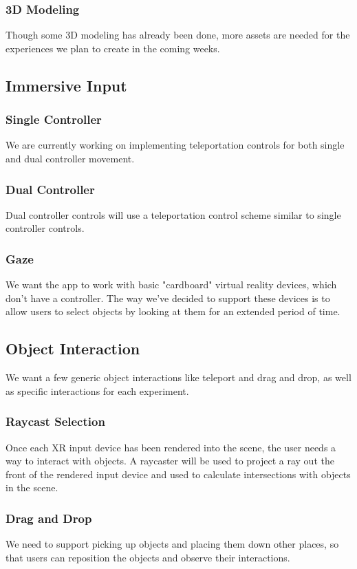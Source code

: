 \documentclass[onecolumn, draftclsnofoot,10pt, compsoc]{IEEEtran}
\begin{document}
\subsubsection{3D Modeling}
Though some 3D modeling has already been done, more assets are needed for the experiences we plan to create in the coming weeks.
\subsection{Immersive Input}
\subsubsection{Single Controller}
We are currently working on implementing teleportation controls for both single and dual controller movement.
\subsubsection{Dual Controller}
Dual controller controls will use a teleportation control scheme similar to single controller controls.
\subsubsection{Gaze}
We want the app to work with basic "cardboard" virtual reality devices, which don't have a controller. The way we've decided to support these devices is to allow users to select objects by looking at them for an extended period of time. 
\subsection{Object Interaction}
We want a few generic object interactions like teleport and drag and drop, as well as specific interactions for each experiment.
\subsubsection{Raycast Selection}
Once each XR input device has been rendered into the scene, the user needs a way to interact with objects. A raycaster will be used to project a ray out the front of the rendered input device and used to calculate intersections with objects in the scene.
\subsubsection{Drag and Drop}
We need to support picking up objects and placing them down other places, so that users can reposition the objects and observe their interactions. 
\end{document}

